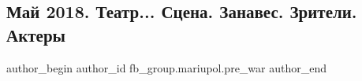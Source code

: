  
 
 
 
 

\subsection{Май 2018. Театр... Сцена. Занавес. Зрители. Актеры}
\label{sec:14_02_2023.fb.fb_group.mariupol.pre_war.1.mai_2018__teatr__sts}

\ifcmt
 author_begin
   author_id fb_group.mariupol.pre_war
 author_end
\fi
